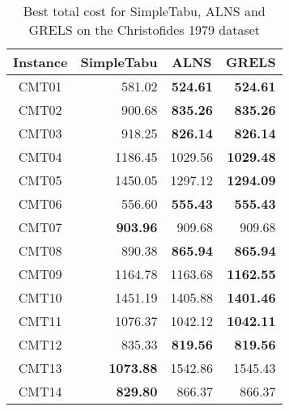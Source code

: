 \begin{table}[]
\begin{tabular}{ |c|r|r|r| }
\hline
\multicolumn{1}{|c|}{ \textbf{ Instance } } & \multicolumn{1}{c|}{ \textbf{ SimpleTabu } } & \multicolumn{1}{c|}{ \textbf{ ALNS } } & \multicolumn{1}{c|}{ \textbf{ GRELS } } \\ \hline
CMT01 & 581.02 & \textbf{ 524.61 } & \textbf{ 524.61 } \\ \hline
CMT02 & 900.68 & \textbf{ 835.26 } & \textbf{ 835.26 } \\ \hline
CMT03 & 918.25 & \textbf{ 826.14 } & \textbf{ 826.14 } \\ \hline
CMT04 & 1186.45 & 1029.56 & \textbf{ 1029.48 } \\ \hline
CMT05 & 1450.05 & 1297.12 & \textbf{ 1294.09 } \\ \hline
CMT06 & 556.60 & \textbf{ 555.43 } & \textbf{ 555.43 } \\ \hline
CMT07 & \textbf{ 903.96 } & 909.68 & 909.68 \\ \hline
CMT08 & 890.38 & \textbf{ 865.94 } & \textbf{ 865.94 } \\ \hline
CMT09 & 1164.78 & 1163.68 & \textbf{ 1162.55 } \\ \hline
CMT10 & 1451.19 & 1405.88 & \textbf{ 1401.46 } \\ \hline
CMT11 & 1076.37 & 1042.12 & \textbf{ 1042.11 } \\ \hline
CMT12 & 835.33 & \textbf{ 819.56 } & \textbf{ 819.56 } \\ \hline
CMT13 & \textbf{ 1073.88 } & 1542.86 & 1545.43 \\ \hline
CMT14 & \textbf{ 829.80 } & 866.37 & 866.37 \\ \hline
\end{tabular}
\caption{ Best total cost for SimpleTabu, ALNS and GRELS on the Christofides 1979 dataset }
\label{ tab:compare-others-cmt }
\end{table}
